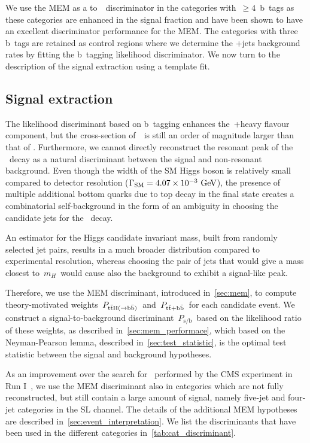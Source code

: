 We use the MEM as a \ttHbb\xspace to~\ttbb~discriminator in the categories with~$\ge 4$~b~tags as these categories are enhanced in the signal fraction and have been shown to have an excellent discriminator performance for the MEM. The categories with three b~tags are retained as control regions where we determine the \ttbar+jets background rates by fitting the b~tagging likelihood discriminator. We now turn to the description of the signal extraction using a template fit. 

\subsection{Signal extraction}
\label{sec:mem_application}
The likelihood discriminant based on b~tagging enhances the~\ttbar+heavy flavour component, but the cross-section of~\ttbb~is still an order of magnitude larger than that of \ttHbb. Furthermore, we cannot directly reconstruct the resonant peak of the \Hbb~decay as a natural discriminant between the signal and non-resonant background. Even though the width of the SM Higgs boson is relatively small compared to detector resolution ($\Gamma_{\mathrm{SM}} = 4.07 \times 10^{-3}~\mathrm{GeV}$), the presence of multiple additional bottom quarks due to top decay in the final state creates a combinatorial self-background in the form of an ambiguity in choosing the candidate jets for the \Hbb~decay.

An estimator for the Higgs candidate invariant mass, built from randomly selected jet pairs, results in a much broader distribution compared to experimental resolution, whereas choosing the pair of jets that would give a mass closest to~$m_H$~would cause also the background to exhibit a signal-like peak.

Therefore, we use the MEM discriminant, introduced in~\cref{sec:mem}, to compute theory-motivated weights~$P_{\mathrm{t} \bar{\mathrm{t}} \mathrm{H} (\rightarrow \mathrm{b}\bar{\mathrm{b}})}$~and~$P_{\mathrm{t} \bar{\mathrm{t}} + \mathrm{b}\bar{\mathrm{b}}}$~for each candidate event. We construct a signal-to-background discriminant~$P_{\mathrm{s/b}}$~based on the likelihood ratio of these weights, as described in~\cref{sec:mem_performace}, which based on the Neyman-Pearson lemma, described in~\cref{sec:test_statistic}, is the optimal test statistic between the signal and background hypotheses.

As an improvement over the search for~\ttHbb\xspace performed by the CMS experiment in Run I~\cite{Khachatryan:2015ila}, we use the MEM discriminant also in categories which are not fully reconstructed, but still contain a large amount of signal, namely five-jet and four-jet categories in the SL channel. The details of the additional MEM hypotheses are described in~\cref{sec:event_interpretation}. We list the discriminants that have been used in the different categories in~\cref{tab:cat_discriminant}. 


